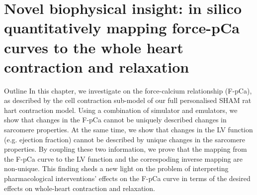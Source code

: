 \chapter{Novel biophysical insight: in silico quantitatively mapping force-pCa curves to the whole heart contraction and relaxation}\label{cha:chapter8}
%
%
%
\begin{remark}{Outline}
    In this chapter, we investigate on the force-calcium relationship (F-pCa), as described by the cell contraction sub-model of our full personalised SHAM rat hart contraction model. Using a combination of simulator and emulators, we show that changes in the F-pCa cannot be uniquely described changes in sarcomere properties. At the same time, we show that changes in the LV function (e.g. ejection fraction) cannot be described by unique changes in the sarcomere properties. By coupling these two information, we prove that the mapping from the F-pCa curve to the LV function and the correspoding inverse mapping are non-unique. This finding sheds a new light on the problem of interpreting pharmacological interventions' effects on the F-pCa curve in terms of the desired effects on whole-heart contraction and relaxation.
\end{remark}







